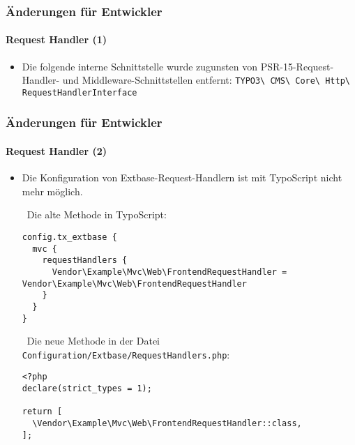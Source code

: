 
\begin{frame}[fragile]
	\frametitle{Änderungen für Entwickler}
	\framesubtitle{Request Handler (1)}

	\begin{itemize}
		\item Die folgende interne Schnittstelle wurde zugunsten von
			PSR-15-Request-Handler- und Middleware-Schnittstellen entfernt:\newline
			\texttt{TYPO3\textbackslash
				CMS\textbackslash
				Core\textbackslash
				Http\textbackslash
				RequestHandlerInterface}

	\end{itemize}

\end{frame}


\begin{frame}[fragile]
	\frametitle{Änderungen für Entwickler}
	\framesubtitle{Request Handler (2)}

	\lstset{basicstyle=\tiny\ttfamily}

	\begin{itemize}
		\item Die Konfiguration von Extbase-Request-Handlern ist mit TypoScript nicht mehr möglich.

		\smaller\ Die alte Methode in TypoScript:\normalsize
\begin{lstlisting}
config.tx_extbase {
  mvc {
    requestHandlers {
      Vendor\Example\Mvc\Web\FrontendRequestHandler = Vendor\Example\Mvc\Web\FrontendRequestHandler
    }
  }
}
\end{lstlisting}

		\smaller\ Die neue Methode in der Datei \texttt{Configuration/Extbase/RequestHandlers.php}:\normalsize
\begin{lstlisting}
<?php
declare(strict_types = 1);

return [
  \Vendor\Example\Mvc\Web\FrontendRequestHandler::class,
];
\end{lstlisting}

	\end{itemize}

\end{frame}


